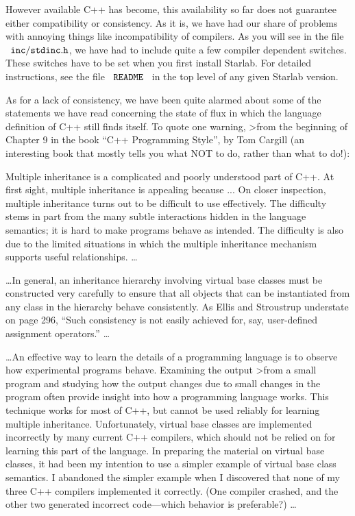 However available C++ has become, this availability so far does not
guarantee either compatibility or consistency.  As it is, we have had
our share of problems with annoying things like incompatibility of
compilers. As you will see in the file ~$\tt inc/stdinc.h$, we have
had to include quite a few compiler dependent switches.  These
switches have to be set when you first install Starlab.  For detailed
instructions, see the file ~$\tt README$~ in the top level of any
given Starlab version.

As for a lack of consistency, we have been quite alarmed about some of
the statements we have read concerning the state of flux in which the
language definition of C++ still finds itself.  To quote one warning,
>from the beginning of Chapter 9 in the book ``C++ Programming Style'',
by Tom Cargill (an interesting book that mostly tells you what NOT to
do, rather than what to do!):

\item{}
Multiple inheritance is a complicated and poorly understood part of C++.
At first sight, multiple inheritance is appealing because ... On
closer inspection, multiple inheritance turns out to be difficult to
use effectively.  The difficulty stems in part from the many subtle
interactions hidden in the language semantics; it is hard to make
programs behave as intended.  The difficulty is also due to the
limited situations in which the multiple inheritance mechanism
supports useful relationships. \dots

\item{}
\dots In general, an inheritance hierarchy involving virtual base
classes must be constructed very carefully to ensure that all objects
that can be instantiated from any class in the hierarchy behave
consistently.  As Ellis and Stroustrup understate on page 296, ``Such
consistency is not easily achieved for, say, user-defined assignment
operators.'' \dots

\item{}
\dots An effective way to learn the details of a programming language is
to observe how experimental programs behave.  Examining the output
>from a small program and studying how the output changes due to small
changes in the program often provide insight into how a programming
language works.  This technique works for most of C++, but cannot be
used reliably for learning multiple inheritance. Unfortunately,
virtual base classes are implemented incorrectly by many current C++
compilers, which should not be relied on for learning this part of the
language.  In preparing the material on virtual base classes, it had
been my intention to use a simpler example of virtual base class
semantics.  I abandoned the simpler example when I discovered that
none of my three C++ compilers implemented it correctly.  (One
compiler crashed, and the other two generated incorrect code---which
behavior is preferable?) \dots

